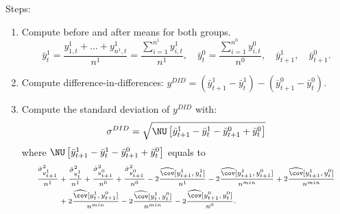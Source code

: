 \begin{frame}[t]{}
Steps:
\begin{enumerate}
\vspace{1.0ex}\setlength{\itemsep}{1.0ex}\setlength{\baselineskip}{12pt}
\item	Compute before and after means for both groups. 
\[
\bar{y}^{1}_{t}=\frac{y^{1}_{1,t}+ \dots + y^{1}_{n^{1},t}}{n^{1}}=\frac{\sum\limits_{i=1}^{n^{1}}y^{1}_{i,t}}{n^{1}}, \quad
\bar{y}^{0}_{t}=\frac{\sum\limits_{i=1}^{n^{0}}y^{0}_{i,t}}{n^{0}}, \quad
\bar{y}^{1}_{t+1}%
, \quad
\bar{y}^{0}_{t+1}%
.
\]
\pause
\item	Compute difference-in-differences: $y^{DID}=(\bar{y}^{1}_{t+1}-\bar{y}^{1}_{t})-(\bar{y}^{0}_{t+1}-\bar{y}^{0}_{t})$.
\pause
\item	Compute the standard deviation of $y^{DID}$ with:
\[
\sigma^{DID}
=
\sqrt{\NU\left[\bar{y}^{1}_{t+1}-\bar{y}^{1}_{t}-\bar{y}^{0}_{t+1}+\bar{y}^{0}_{t}\right]}
\]
where $\NU\left[\bar{y}^{1}_{t+1}-\bar{y}^{1}_{t}-\bar{y}^{0}_{t+1}+\bar{y}^{0}_{t}\right]$ equals to
\[\scriptsize
\begin{aligned}
\frac{\hat{\sigma}^{2}_{y^{1}_{t+1}}}{n^{1}}
&
+\frac{\hat{\sigma}^{2}_{y^{1}_{t}}}{n^{1}}
+\frac{\hat{\sigma}^{2}_{y^{0}_{t+1}}}{n^{0}}
+\frac{\hat{\sigma}^{2}_{y^{0}_{t+1}}}{n^{0}}
-2\frac{\widehat{\cov}[y^{1}_{t+1}, y^{1}_{t}]}{n^{1}}
-2\frac{\widehat{\cov}[y^{1}_{t+1}, y^{0}_{t+1}]}{n^{min}}
+2\frac{\widehat{\cov}[y^{1}_{t+1}, y^{0}_{t}]}{n^{min}}\\
&
+2\frac{\widehat{\cov}[y^{1}_{t}, y^{0}_{t+1}]}{n^{min}}
-2\frac{\widehat{\cov}[y^{1}_{t}, y^{0}_{t}]}{n^{min}}
-2\frac{\widehat{\cov}[y^{0}_{t+1}, y^{0}_{t}]}{n^{0}}.
\end{aligned}
\]
\end{enumerate}
\end{frame}

